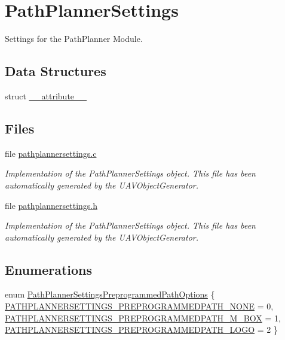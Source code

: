 \hypertarget{group___path_planner_settings}{\section{\-Path\-Planner\-Settings}
\label{group___path_planner_settings}
}


\-Settings for the \-Path\-Planner \-Module.  


\subsection*{\-Data \-Structures}
\begin{DoxyCompactItemize}
\item 
struct \hyperlink{struct____attribute____}{\-\_\-\-\_\-attribute\-\_\-\-\_\-}
\end{DoxyCompactItemize}
\subsection*{\-Files}
\begin{DoxyCompactItemize}
\item 
file \hyperlink{pathplannersettings_8c}{pathplannersettings.\-c}
\begin{DoxyCompactList}\small\item\em \-Implementation of the \-Path\-Planner\-Settings object. \-This file has been automatically generated by the \-U\-A\-V\-Object\-Generator. \end{DoxyCompactList}\item 
file \hyperlink{pathplannersettings_8h}{pathplannersettings.\-h}
\begin{DoxyCompactList}\small\item\em \-Implementation of the \-Path\-Planner\-Settings object. \-This file has been automatically generated by the \-U\-A\-V\-Object\-Generator. \end{DoxyCompactList}\end{DoxyCompactItemize}
\subsection*{\-Enumerations}
\begin{DoxyCompactItemize}
\item 
enum \hyperlink{group___path_planner_settings_ga6ea7b8e7859111de2c21447da680e040}{\-Path\-Planner\-Settings\-Preprogrammed\-Path\-Options} \{ \hyperlink{group___path_planner_settings_gga6ea7b8e7859111de2c21447da680e040af589fcaec01b361cc2b4085b64bc33bb}{\-P\-A\-T\-H\-P\-L\-A\-N\-N\-E\-R\-S\-E\-T\-T\-I\-N\-G\-S\-\_\-\-P\-R\-E\-P\-R\-O\-G\-R\-A\-M\-M\-E\-D\-P\-A\-T\-H\-\_\-\-N\-O\-N\-E} = 0, 
\hyperlink{group___path_planner_settings_gga6ea7b8e7859111de2c21447da680e040a267a771d345432e1ce96d9d098d5ab8f}{\-P\-A\-T\-H\-P\-L\-A\-N\-N\-E\-R\-S\-E\-T\-T\-I\-N\-G\-S\-\_\-\-P\-R\-E\-P\-R\-O\-G\-R\-A\-M\-M\-E\-D\-P\-A\-T\-H\-\_\-M\-\_\-\-B\-O\-X} = 1, 
\hyperlink{group___path_planner_settings_gga6ea7b8e7859111de2c21447da680e040a7f86c6810ed8afc16229673980a6e7e5}{\-P\-A\-T\-H\-P\-L\-A\-N\-N\-E\-R\-S\-E\-T\-T\-I\-N\-G\-S\-\_\-\-P\-R\-E\-P\-R\-O\-G\-R\-A\-M\-M\-E\-D\-P\-A\-T\-H\-\_\-\-L\-O\-G\-O} = 2
 \}
\end{DoxyCompactItemize}
